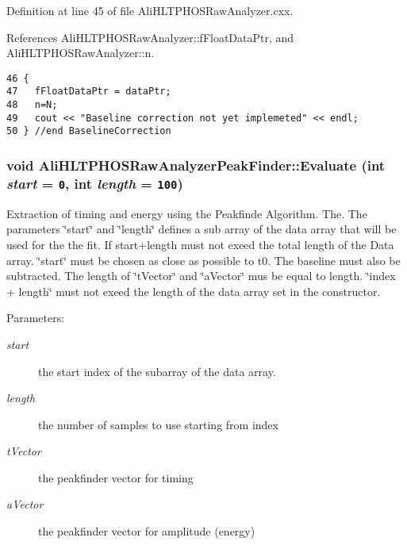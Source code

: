 Definition at line 45 of file Ali\-HLTPHOSRaw\-Analyzer.cxx.

References Ali\-HLTPHOSRaw\-Analyzer::f\-Float\-Data\-Ptr, and Ali\-HLTPHOSRaw\-Analyzer::n.

\footnotesize\begin{verbatim}46 {
47   fFloatDataPtr = dataPtr;  
48   n=N;
49   cout << "Baseline correction not yet implemeted" << endl;
50 } //end BaselineCorrection
\end{verbatim}\normalsize 


\subsubsection{\setlength{\rightskip}{0pt plus 5cm}void Ali\-HLTPHOSRaw\-Analyzer\-Peak\-Finder::Evaluate (int {\em start} = {\tt 0}, int {\em length} = {\tt 100})\hspace{0.3cm}{\tt  [virtual]}}\label{classAliHLTPHOSRawAnalyzerPeakFinder_AliHLTPHOSRawAnalyzerPeakFindera6}


Extraction of timing and energy using the Peakfinde Algorithm. The. The parameters \char`\"{}start\char`\"{} and \char`\"{}length\char`\"{} defines a sub array of the data array that will be used for the the fit. If start+length must not exeed the total length of the Data array. \char`\"{}start\char`\"{} must be chosen as close as possible to t0. The baseline must also be subtracted. The length of \char`\"{}t\-Vector\char`\"{} and \char`\"{}a\-Vector\char`\"{} mus be equal to length. \char`\"{}index + length\char`\"{} must not exeed the length of the data array set in the constructor. \begin{Desc}
\item[Parameters:]
\begin{description}
\item[{\em start}]the start index of the subarray of the data array. \item[{\em length}]the number of samples to use starting from index \item[{\em t\-Vector}]the peakfinder vector for timing \item[{\em a\-Vector}]the peakfinder vector for amplitude (energy) \end{description}
\end{Desc}


